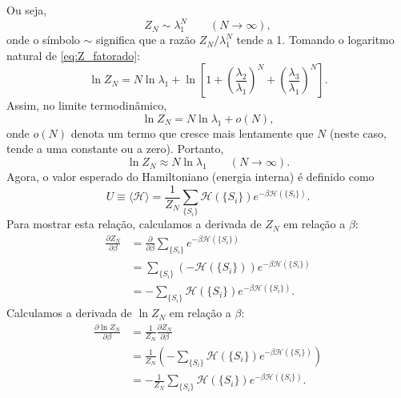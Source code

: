 \documentclass[11pt,a4paper]{article}
\begin{document}
%
Ou seja,
%
\begin{equation}
    Z_N \sim \lambda_1^N
    \qquad (N \to \infty),
    \label{eq:Z_approx}
\end{equation}
%
onde o símbolo \(\sim\) significa que a razão \(Z_N / \lambda_1^N\) tende a 1.
%
Tomando o logaritmo natural de \eqref{eq:Z_fatorado}:
%
\begin{equation}
    \ln Z_N = N \ln \lambda_1 + \ln\left[ 1 + \left( \frac{\lambda_2}{\lambda_1} \right)^N + \left( \frac{\lambda_3}{\lambda_1} \right)^N \right].
    \label{eq:lnZ_exato}
\end{equation}
%
Assim, no limite termodinâmico,
%
\begin{equation}
    \ln Z_N = N \ln \lambda_1 + o(N),
\end{equation}
%
onde \(o(N)\) denota um termo que cresce mais lentamente que \(N\) (neste caso, tende a uma constante ou a zero). Portanto,
%
\begin{equation}
    \ln Z_N \approx N \ln \lambda_1
    \qquad (N \to \infty).
    \label{eq:lnZ_approx}
\end{equation}
%
Agora, o valor esperado do Hamiltoniano (energia interna) é definido como
%
\begin{equation}
    U \equiv \langle \mathcal H \rangle
    = \frac{1}{Z_N} \sum_{\{S_i\}} \mathcal H(\{S_i\}) e^{-\beta \mathcal H(\{S_i\})}.
    \label{eq:U_def}
\end{equation}
%
Para mostrar esta relação, calculamos a derivada de \(Z_N\) em relação a \(\beta\):
%
\begin{align}
    \frac{\partial Z_N}{\partial \beta}
    &= \frac{\partial}{\partial \beta} \sum_{\{S_i\}} e^{-\beta \mathcal H(\{S_i\})} \\
    &= \sum_{\{S_i\}} \left( -\mathcal H(\{S_i\}) \right) e^{-\beta \mathcal H(\{S_i\})} \\
    &= - \sum_{\{S_i\}} \mathcal H(\{S_i\}) e^{-\beta \mathcal H(\{S_i\})}.
    \label{eq:dZ_dbeta}
\end{align}
%
Calculamos a derivada de \(\ln Z_N\) em relação a \(\beta\):
%
\begin{align}
    \frac{\partial \ln Z_N}{\partial \beta}
    &= \frac{1}{Z_N} \frac{\partial Z_N}{\partial \beta} \\
    &= \frac{1}{Z_N} \left( - \sum_{\{S_i\}} \mathcal H(\{S_i\}) e^{-\beta \mathcal H(\{S_i\})} \right) \\
    &= - \frac{1}{Z_N} \sum_{\{S_i\}} \mathcal H(\{S_i\}) e^{-\beta \mathcal H(\{S_i\})}.
    \label{eq:dlnZ_dbeta}
\end{align}
\end{document}
